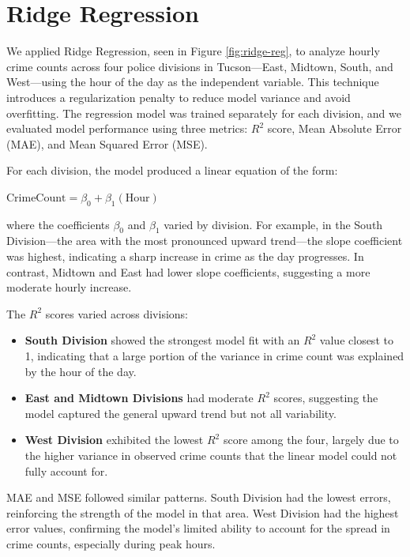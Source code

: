 \documentclass{report}
\begin{document}
\newpage
\section{Ridge Regression}
\par We applied Ridge Regression, seen in Figure \ref{fig:ridge-reg}, to analyze hourly crime counts across four police divisions in Tucson—East, Midtown, South, and West—using the hour of the day as the independent variable. This technique introduces a regularization penalty to reduce model variance and avoid overfitting. The regression model was trained separately for each division, and we evaluated model performance using three metrics: $R^2$ score, Mean Absolute Error (MAE), and Mean Squared Error (MSE).

For each division, the model produced a linear equation of the form:

\begin{center}
  \begin{math}
    \text{CrimeCount} = \beta_0 + \beta_1(\text{Hour})
  \end{math}
\end{center}

where the coefficients $\beta_0$ and $\beta_1$ varied by division. For example, in the South Division—the area with the most pronounced upward trend—the slope coefficient was highest, indicating a sharp increase in crime as the day progresses. In contrast, Midtown and East had lower slope coefficients, suggesting a more moderate hourly increase.

The $R^2$ scores varied across divisions:
\begin{itemize}
\item \textbf{South Division} showed the strongest model fit with an $R^2$ value closest to 1, indicating that a large portion of the variance in crime count was explained by the hour of the day.
\item \textbf{East and Midtown Divisions} had moderate $R^2$ scores, suggesting the model captured the general upward trend but not all variability.
\item \textbf{West Division} exhibited the lowest $R^2$ score among the four, largely due to the higher variance in observed crime counts that the linear model could not fully account for.
\end{itemize}

MAE and MSE followed similar patterns. South Division had the lowest errors, reinforcing the strength of the model in that area. West Division had the highest error values, confirming the model's limited ability to account for the spread in crime counts, especially during peak hours.
\end{document}
